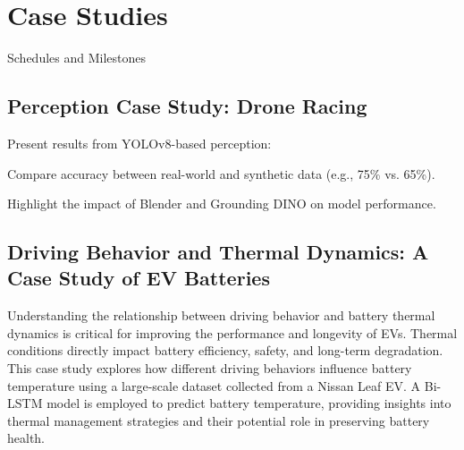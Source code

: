 

\chapter{Case Studies}\label{ch:5}
\minitoc

Schedules and Milestones

\newpage

\section{Perception Case Study: Drone Racing}

Present results from YOLOv8-based perception:

Compare accuracy between real-world and synthetic data (e.g., 75\% vs. 65\%).

Highlight the impact of Blender and Grounding DINO on model performance.


\section{Driving Behavior and Thermal Dynamics: A Case Study of EV Batteries}
\label{sec:thermal_dynamics_case_study}

Understanding the relationship between driving behavior and battery thermal dynamics is critical for improving the performance and longevity of \glspl{EV}. 
Thermal conditions directly impact battery efficiency, safety, and long-term degradation. 
This case study explores how different driving behaviors influence battery temperature using a large-scale dataset collected from a Nissan Leaf \gls{EV}. 
A \gls{Bi-LSTM} model is employed to predict battery temperature, providing insights into thermal management strategies and their potential role in preserving battery health.


